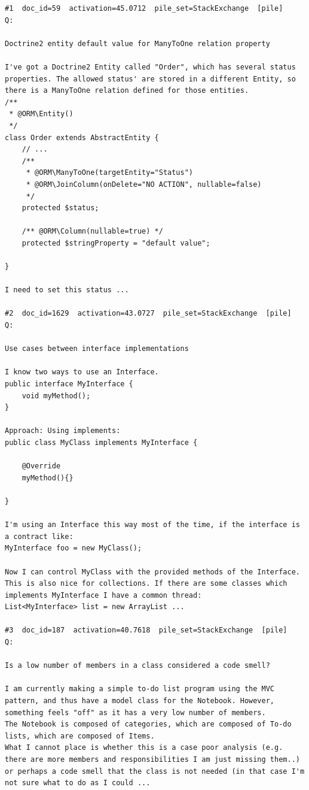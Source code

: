\begin{verbatim}
#1  doc_id=59  activation=45.0712  pile_set=StackExchange  [pile]
Q:

Doctrine2 entity default value for ManyToOne relation property

I've got a Doctrine2 Entity called "Order", which has several status properties. The allowed status' are stored in a different Entity, so there is a ManyToOne relation defined for those entities.
/**
 * @ORM\Entity()
 */
class Order extends AbstractEntity {
    // ...
    /**
     * @ORM\ManyToOne(targetEntity="Status")
     * @ORM\JoinColumn(onDelete="NO ACTION", nullable=false)
     */
    protected $status;

    /** @ORM\Column(nullable=true) */
    protected $stringProperty = "default value";

}

I need to set this status ...

#2  doc_id=1629  activation=43.0727  pile_set=StackExchange  [pile]
Q:

Use cases between interface implementations

I know two ways to use an Interface. 
public interface MyInterface {
    void myMethod();
}

Approach: Using implements:
public class MyClass implements MyInterface {

    @Override
    myMethod(){}

}

I'm using an Interface this way most of the time, if the interface is a contract like:
MyInterface foo = new MyClass();   

Now I can control MyClass with the provided methods of the Interface.
This is also nice for collections. If there are some classes which implements MyInterface I have a common thread:  
List<MyInterface> list = new ArrayList ...

#3  doc_id=187  activation=40.7618  pile_set=StackExchange  [pile]
Q:

Is a low number of members in a class considered a code smell?

I am currently making a simple to-do list program using the MVC pattern, and thus have a model class for the Notebook. However, something feels "off" as it has a very low number of members.
The Notebook is composed of categories, which are composed of To-do lists, which are composed of Items. 
What I cannot place is whether this is a case poor analysis (e.g. there are more members and responsibilities I am just missing them..) or perhaps a code smell that the class is not needed (in that case I'm not sure what to do as I could ...


\end{verbatim}

